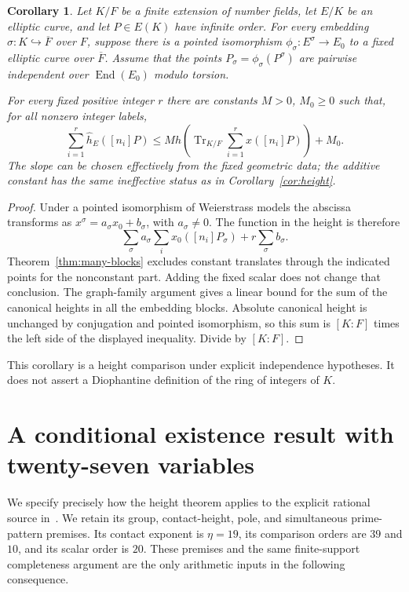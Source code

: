 \documentclass[11pt,a4paper]{article}
\newtheorem{corollary}[theorem]{Corollary}
\DeclareMathOperator{\End}{End}
\DeclareMathOperator{\Tr}{Tr}
\begin{document}
\begin{corollary}\label{cor:number-fields}
Let $K/F$ be a finite extension of number fields, let $E/K$
be an elliptic curve, and let $P\in E(K)$ have infinite order.
For every embedding $\sigma:K\hookrightarrow\overline F$
over $F$, suppose there is a pointed isomorphism
$\phi_\sigma:E^\sigma\to E_0$ to a fixed elliptic curve over
$\overline F$. Assume that the points
$P_\sigma=\phi_\sigma(P^\sigma)$ are pairwise independent
over $\End(E_0)$ modulo torsion.

For every fixed positive integer $r$ there are constants
$M>0$, $M_0\ge0$ such that, for all nonzero integer labels,
\[
 \sum_{i=1}^r\widehat h_E([n_i]P)
 \le M h\!\left(\Tr_{K/F}
                    \sum_{i=1}^r x([n_i]P)\right)+M_0.
\]
The slope can be chosen effectively from the fixed geometric
data; the additive constant has the same ineffective status
as in Corollary~\ref{cor:height}.
\end{corollary}
\begin{proof}
Under a pointed isomorphism of Weierstrass models the
abscissa transforms as
$x^\sigma=a_\sigma x_0+b_\sigma$, with $a_\sigma\ne0$.
The function in the height is therefore
\[
 \sum_\sigma a_\sigma\sum_i x_0([n_i]P_\sigma)
                  +r\sum_\sigma b_\sigma.
\]
Theorem~\ref{thm:many-blocks} excludes constant translates
through the indicated points for the nonconstant part.
Adding the fixed scalar does not change that conclusion.
The graph-family argument gives a linear bound for the sum
of the canonical heights in all the embedding blocks.
Absolute canonical height is unchanged by conjugation and
pointed isomorphism, so this sum is $[K:F]$ times the left
side of the displayed inequality. Divide by $[K:F]$.
\end{proof}

This corollary is a height comparison under explicit
independence hypotheses. It does not assert a Diophantine
definition of the ring of integers of $K$.

\section{A conditional existence result with twenty-seven variables}

We specify precisely how the height theorem applies to the
explicit rational source in~\cite{Baseline29}. We retain its group, contact-height,
pole, and simultaneous prime-pattern premises. Its contact
exponent is $\eta=19$, its comparison orders are $39$ and
$10$, and its scalar order is $20$. These premises and the
same finite-support completeness argument are the only
arithmetic inputs in the following consequence.
\end{document}
